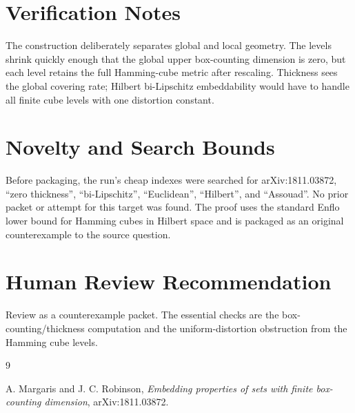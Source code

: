\documentclass[11pt]{article}
\begin{document}
\section*{Verification Notes}

The construction deliberately separates global and local geometry. The levels
shrink quickly enough that the global upper box-counting dimension is zero,
but each level retains the full Hamming-cube metric after rescaling. Thickness
sees the global covering rate; Hilbert bi-Lipschitz embeddability would have
to handle all finite cube levels with one distortion constant.

\section*{Novelty and Search Bounds}

Before packaging, the run's cheap indexes were searched for arXiv:1811.03872,
``zero thickness'', ``bi-Lipschitz'', ``Euclidean'', ``Hilbert'', and
``Assouad''. No prior packet or attempt for this target was found. The proof
uses the standard Enflo lower bound for Hamming cubes in Hilbert space and is
packaged as an original counterexample to the source question.

\section*{Human Review Recommendation}

Review as a counterexample packet. The essential checks are the
box-counting/thickness computation and the uniform-distortion obstruction from
the Hamming cube levels.

\begin{thebibliography}{9}

A. Margaris and J. C. Robinson,
\emph{Embedding properties of sets with finite box-counting dimension},
arXiv:1811.03872.

\end{thebibliography}
\end{document}
